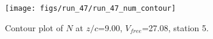 \begin{figure}[H]
\centering
\texttt{[image: figs/run\_47/run\_47\_num\_contour]}
\caption{Contour plot of $N$ at $z/c$=9.00, $V_{free}$=27.08, station 5.}
\end{figure}


